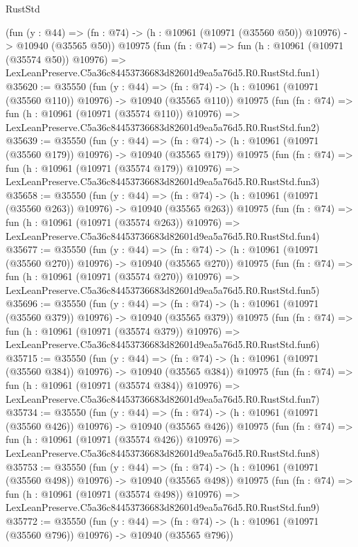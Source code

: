 \begin{lexlean}{RustStd}
\begin{coremodule}
    (fun (y : @44) =>
    (fn : @74) -> (h : @10961 (@10971 (@35560 @50)) @10976) -> @10940 (@35565 @50))
    @10975
    (fun (fn : @74) =>
    fun (h : @10961 (@10971 (@35574 @50)) @10976) =>
    LexLeanPreserve.C5a36c84453736683d82601d9ea5a76d5.R0.RustStd.fun1)
@35620 := @35550
    (fun (y : @44) =>
    (fn : @74) -> (h : @10961 (@10971 (@35560 @110)) @10976) -> @10940 (@35565 @110))
    @10975
    (fun (fn : @74) =>
    fun (h : @10961 (@10971 (@35574 @110)) @10976) =>
    LexLeanPreserve.C5a36c84453736683d82601d9ea5a76d5.R0.RustStd.fun2)
@35639 := @35550
    (fun (y : @44) =>
    (fn : @74) -> (h : @10961 (@10971 (@35560 @179)) @10976) -> @10940 (@35565 @179))
    @10975
    (fun (fn : @74) =>
    fun (h : @10961 (@10971 (@35574 @179)) @10976) =>
    LexLeanPreserve.C5a36c84453736683d82601d9ea5a76d5.R0.RustStd.fun3)
@35658 := @35550
    (fun (y : @44) =>
    (fn : @74) -> (h : @10961 (@10971 (@35560 @263)) @10976) -> @10940 (@35565 @263))
    @10975
    (fun (fn : @74) =>
    fun (h : @10961 (@10971 (@35574 @263)) @10976) =>
    LexLeanPreserve.C5a36c84453736683d82601d9ea5a76d5.R0.RustStd.fun4)
@35677 := @35550
    (fun (y : @44) =>
    (fn : @74) -> (h : @10961 (@10971 (@35560 @270)) @10976) -> @10940 (@35565 @270))
    @10975
    (fun (fn : @74) =>
    fun (h : @10961 (@10971 (@35574 @270)) @10976) =>
    LexLeanPreserve.C5a36c84453736683d82601d9ea5a76d5.R0.RustStd.fun5)
@35696 := @35550
    (fun (y : @44) =>
    (fn : @74) -> (h : @10961 (@10971 (@35560 @379)) @10976) -> @10940 (@35565 @379))
    @10975
    (fun (fn : @74) =>
    fun (h : @10961 (@10971 (@35574 @379)) @10976) =>
    LexLeanPreserve.C5a36c84453736683d82601d9ea5a76d5.R0.RustStd.fun6)
@35715 := @35550
    (fun (y : @44) =>
    (fn : @74) -> (h : @10961 (@10971 (@35560 @384)) @10976) -> @10940 (@35565 @384))
    @10975
    (fun (fn : @74) =>
    fun (h : @10961 (@10971 (@35574 @384)) @10976) =>
    LexLeanPreserve.C5a36c84453736683d82601d9ea5a76d5.R0.RustStd.fun7)
@35734 := @35550
    (fun (y : @44) =>
    (fn : @74) -> (h : @10961 (@10971 (@35560 @426)) @10976) -> @10940 (@35565 @426))
    @10975
    (fun (fn : @74) =>
    fun (h : @10961 (@10971 (@35574 @426)) @10976) =>
    LexLeanPreserve.C5a36c84453736683d82601d9ea5a76d5.R0.RustStd.fun8)
@35753 := @35550
    (fun (y : @44) =>
    (fn : @74) -> (h : @10961 (@10971 (@35560 @498)) @10976) -> @10940 (@35565 @498))
    @10975
    (fun (fn : @74) =>
    fun (h : @10961 (@10971 (@35574 @498)) @10976) =>
    LexLeanPreserve.C5a36c84453736683d82601d9ea5a76d5.R0.RustStd.fun9)
@35772 := @35550
    (fun (y : @44) =>
    (fn : @74) -> (h : @10961 (@10971 (@35560 @796)) @10976) -> @10940 (@35565 @796))

\end{coremodule}
\end{lexlean}
